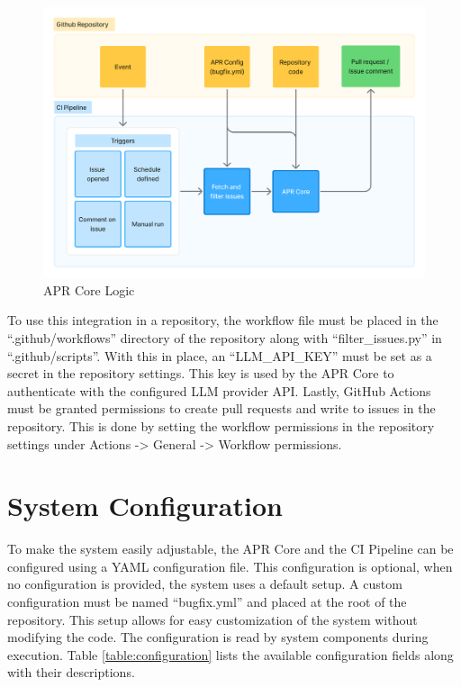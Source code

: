 \begin{figure}[H]
    \centering
    \includegraphics[width=1\textwidth]{images/flowcharts/ci.png}
    \caption{APR Core Logic}
    \label{fig:ci}
\end{figure}

To use this integration in a repository, the workflow file must be placed in the ``.github/workflows'' directory of the repository along with ``filter\_issues.py'' in ``.github/scripts''. With this in place, an ``LLM\_API\_KEY'' must be set as a secret in the repository settings. This key is used by the APR Core to authenticate with the configured LLM provider API. Lastly, GitHub Actions must be granted permissions to create pull requests and write to issues in the repository. This is done by setting the workflow permissions in the repository settings under Actions -> General -> Workflow permissions.

\section{System Configuration}
To make the system easily adjustable, the APR Core and the CI Pipeline can be configured using a YAML configuration file. This configuration is optional, when no configuration is provided, the system uses a default setup. A custom configuration must be named ``bugfix.yml'' and placed at the root of the repository. This setup allows for easy customization of the system without modifying the code. The configuration is read by system components during execution. Table \ref{table:configuration} lists the available configuration fields along with their descriptions.

